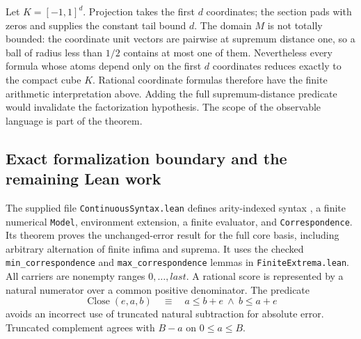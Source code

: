 Let $K=[-1,1]^d$. Projection takes the first $d$ coordinates; the
section pads with zeros and supplies the constant tail bound $d$.
The domain $M$ is not totally bounded: the coordinate unit vectors
are pairwise at supremum distance one, so a ball of radius less than
$1/2$ contains at most one of them. Nevertheless every formula whose
atoms depend only on the first $d$ coordinates reduces exactly to the
compact cube $K$. Rational coordinate formulas therefore have the
finite arithmetic interpretation above. Adding the full
supremum-distance predicate would invalidate the factorization
hypothesis. The scope of the observable language is part of the theorem.

\subsection{Exact formalization boundary and the remaining Lean work}
\label{subsec:cm-lean}

The supplied file \texttt{ContinuousSyntax.lean} defines arity-indexed
syntax , a finite numerical
\texttt{Model}, environment extension, a finite evaluator, and
\texttt{Correspondence}. Its theorem
 proves the
unchanged-error result for the full core basis, including arbitrary
alternation of finite infima and suprema. It uses the checked
\texttt{min\_correspondence} and \texttt{max\_correspondence}
lemmas in \texttt{FiniteExtrema.lean}. All carriers are nonempty ranges
$0,\ldots,\mathit{last}$. A rational score is represented by a natural
numerator over a common positive denominator. The predicate
\[
 \operatorname{Close}(e,a,b)\quad\equiv\quad
       a\leq b+e\ \wedge\ b\leq a+e
\]
avoids an incorrect use of truncated natural subtraction for absolute
error. Truncated complement agrees with $B-a$ on $0\leq a\leq B$.

